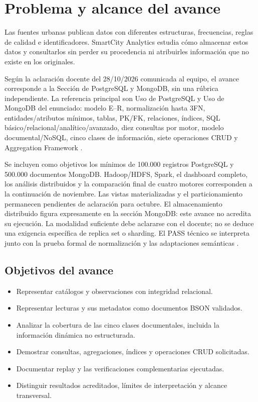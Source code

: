 \section{Problema y alcance del avance}
Las fuentes urbanas publican datos con diferentes estructuras, frecuencias,
reglas de calidad e identificadores. SmartCity Analytics estudia cómo almacenar
estos datos y consultarlos sin perder su procedencia ni atribuirles información
que no existe en los originales.

Según la aclaración docente del 28/10/2026 comunicada al equipo, el avance corresponde a la Sección de PostgreSQL y MongoDB, sin una rúbrica
independiente. La referencia principal son Uso de PostgreSQL y Uso de MongoDB
del enunciado: modelo E--R, normalización hasta 3FN, entidades/atributos mínimos,
tablas, PK/FK, relaciones, índices, SQL básico/relacional/analítico/avanzado,
diez consultas por motor, modelo documental/NoSQL, cinco clases de información,
siete operaciones CRUD y Aggregation Framework \cite{enunciado,alcance}.

Se incluyen como objetivos los mínimos de 100.000 registros PostgreSQL y
500.000 documentos MongoDB. Hadoop/HDFS, Spark, el dashboard completo, los
análisis distribuidos y la comparación final de cuatro motores corresponden a
la continuación de noviembre. Las vistas materializadas y el particionamiento
permanecen pendientes de aclaración para octubre. El almacenamiento distribuido
figura expresamente en la sección MongoDB: este avance no acredita su ejecución.
La modalidad suficiente debe aclararse con el docente; no se deduce una exigencia
específica de replica set o sharding.
El PASS técnico se interpreta junto con la prueba formal de normalización y
las adaptaciones semánticas \cite{alcance}.

\subsection{Objetivos del avance}
\begin{itemize}
\item Representar catálogos y observaciones con integridad relacional.
\item Representar lecturas y sus metadatos como documentos BSON validados.
\item Analizar la cobertura de las cinco clases documentales, incluida la
información dinámica no estructurada.
\item Demostrar consultas, agregaciones, índices y operaciones CRUD solicitadas.
\item Documentar replay y las verificaciones complementarias ejecutadas.
\item Distinguir resultados acreditados, límites de interpretación y alcance transversal.
\end{itemize}

